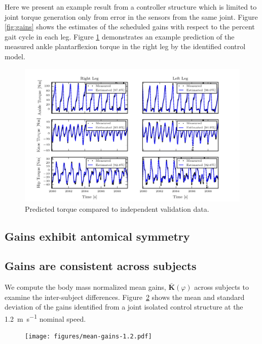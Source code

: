 \documentclass{article}
\begin{document}
Here we present an example result from a controller structure which is limited
to joint torque generation only from error in the sensors from the same joint.
Figure \ref{fig:gains} shows the estimates of the scheduled gains with respect
to the percent gait cycle in each leg. Figure \ref{fig:fit} demonstrates an
example prediction of the measured ankle plantarflexion torque in the right leg
by the identified control model.
%
\begin{figure}
  \begin{center}
    \includegraphics{figures/example-identified-joint-isolated-fit.pdf}
    \caption{Predicted torque compared to independent validation data.}
    \label{fig:fit}
  \end{center}
\end{figure}
\subsection{Gains exhibit antomical symmetry}
%

\subsection*{Gains are consistent across subjects}
%
We compute the body mass normalized mean gains, $\bar{\mathbf{K}}(\varphi)$
across subjects to examine the inter-subject differences.
Figure~\ref{fig:mean-gains-1.2} shows the mean and standard deviation of the
gains identified from a joint isolated control structure at the
1.2~\si{\meter\per\second} nominal speed.
%
\begin{figure}
  \begin{center}
    \texttt{[image: figures/mean-gains-1.2.pdf]}
    \caption{}
    \label{fig:mean-gains-1.2}
  \end{center}
\end{figure}
\end{document}
